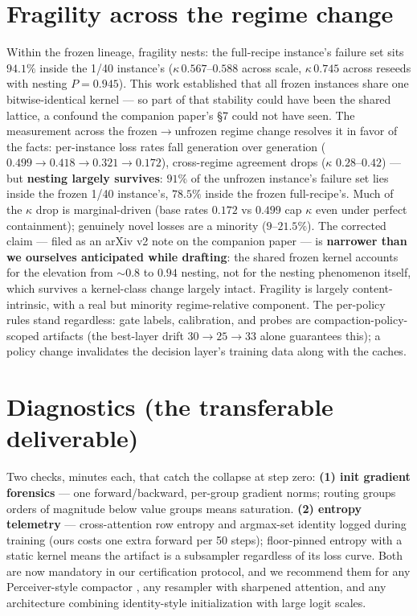 \documentclass[11pt]{article}
\begin{document}
\section{Fragility across the regime change}
\label{sec:fragility}

Within the frozen lineage, fragility nests: the full-recipe instance's
failure set sits $94.1\%$ inside the 1/40 instance's
($\kappa\,0.567$--$0.588$ across scale, $\kappa\,0.745$ across reseeds
with nesting $P{=}0.945$). This work established that all frozen
instances share one bitwise-identical kernel --- so part of that
stability could have been the shared lattice, a confound the companion
paper's \S7 could not have seen. The measurement across the
frozen$\to$unfrozen regime change resolves it in favor of the facts:
per-instance loss rates fall generation over generation
($0.499 \to 0.418 \to 0.321 \to 0.172$), cross-regime agreement drops
($\kappa$ $0.28$--$0.42$) --- but \textbf{nesting largely survives}:
$91\%$ of the unfrozen instance's failure set lies inside the frozen
1/40 instance's, $78.5\%$ inside the frozen full-recipe's. Much of the
$\kappa$ drop is marginal-driven (base rates $0.172$ vs $0.499$ cap
$\kappa$ even under perfect containment); genuinely novel losses are a
minority ($9$--$21.5\%$). The corrected claim --- filed as an arXiv v2
note on the companion paper --- is \textbf{narrower than we ourselves
anticipated while drafting}: the shared frozen kernel accounts for the
elevation from ${\sim}0.8$ to $0.94$ nesting, not for the nesting
phenomenon itself, which survives a kernel-class change largely intact.
Fragility is largely content-intrinsic, with a real but minority
regime-relative component. The per-policy rules stand regardless: gate
labels, calibration, and probes are compaction-policy-scoped artifacts
(the best-layer drift $30 \to 25 \to 33$ alone guarantees this); a
policy change invalidates the decision layer's training data along with
the caches.

\section{Diagnostics (the transferable deliverable)}
\label{sec:diagnostics}

Two checks, minutes each, that catch the collapse at step zero:
\textbf{(1) init gradient forensics} --- one forward/backward, per-group
gradient norms; routing groups orders of magnitude below value groups
means saturation. \textbf{(2) entropy telemetry} --- cross-attention row
entropy and argmax-set identity logged during training (ours costs one
extra forward per 50 steps); floor-pinned entropy with a static kernel
means the artifact is a subsampler regardless of its loss curve. Both
are now mandatory in our certification protocol, and we recommend them
for any Perceiver-style compactor \citep{oneill2026still,kvdistill2025},
any resampler with sharpened attention, and any architecture combining
identity-style initialization with large logit scales.
\end{document}
